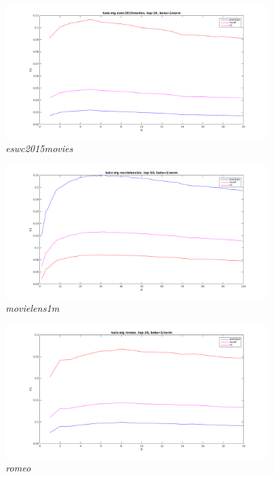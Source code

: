 \begin{figure}[h!]
  \centering
    \includegraphics[width=0.9\textwidth]{fig/katzeig_k/eswc2015movies_katzeig_K.png}
    \vspace{-20pt}
    \caption{\textit{eswc2015movies}}
    \vspace{-10pt}
\end{figure}

\begin{figure}[h!]
  \centering
    \includegraphics[width=0.9\textwidth]{fig/katzeig_k/movielens_katzeig_K.png}
    \vspace{-20pt}
    \caption{\textit{movielens1m}}
    \vspace{-10pt}
\end{figure}

\begin{figure}[h!]
  \centering
    \includegraphics[width=0.9\textwidth]{fig/katzeig_k/romeo_katzeig_K.png}
    \vspace{-20pt}
    \caption{\textit{romeo}}
    \vspace{-10pt}
\end{figure}

